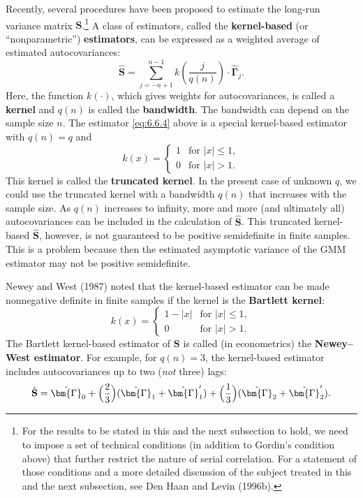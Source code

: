 Recently, several procedures have been proposed to estimate the long-run variance
matrix $\mathbf{S}$.\footnote{For the results to be stated in this and the next subsection to hold, we need to impose a set of technical conditions (in addition to Gordin's condition above) that further restrict the nature of serial correlation. For a statement of those conditions and a more detailed discussion of the subject treated in this and the next subsection, see Den Haan and Levin (1996b).}
A class of estimators, called the \textbf{kernel-based} (or ``nonparametric'')
\textbf{estimators}, can be expressed as a weighted average of estimated autocovariances:
\begin{equation}
  \hat{\mathbf{S}} = \sum_{j=-n+1}^{n-1} k\!\left(\frac{j}{q(n)}\right) \cdot \hat{\bm{\Gamma}}_j.
  \label{eq:6.6.5}
\end{equation}
Here, the function $k(\cdot)$, which gives weights for autocovariances, is called a \textbf{kernel}
and $q(n)$ is called the \textbf{bandwidth}. The bandwidth can depend on the sample size $n$.
The estimator \eqref{eq:6.6.4} above is a special kernel-based estimator with $q(n) = q$ and
\begin{equation}
  k(x) = \begin{cases} 1 & \text{for } |x| \leq 1, \\ 0 & \text{for } |x| > 1. \end{cases}
  \label{eq:6.6.6}
\end{equation}
This kernel is called the \textbf{truncated kernel}. In the present case of unknown $q$,
we could use the truncated kernel with a bandwidth $q(n)$ that increases with the
sample size. As $q(n)$ increases to infinity, more and more (and ultimately all) autocovariances
can be included in the calculation of $\hat{\mathbf{S}}$. This truncated kernel-based
$\hat{\mathbf{S}}$, however, is not guaranteed to be positive semidefinite in finite samples. This is
a problem because then the estimated asymptotic variance of the GMM estimator
may not be positive semidefinite.

Newey and West (1987) noted that the kernel-based estimator can be made
nonnegative definite in finite samples if the kernel is the \textbf{Bartlett kernel}:
\begin{equation}
  k(x) = \begin{cases} 1 - |x| & \text{for } |x| \leq 1, \\ 0 & \text{for } |x| > 1. \end{cases}
  \label{eq:6.6.7}
\end{equation}
The Bartlett kernel-based estimator of $\mathbf{S}$ is called (in econometrics) the \textbf{Newey--West
estimator}. For example, for $q(n) = 3$, the kernel-based estimator includes
autocovariances up to two (\emph{not} three) lags:
\begin{equation}
  \hat{\mathbf{S}} = \hat{\bm{\Gamma}}_0
  + \Bigl(\frac{2}{3}\Bigr)(\hat{\bm{\Gamma}}_1 + \hat{\bm{\Gamma}}_1')
  + \Bigl(\frac{1}{3}\Bigr)(\hat{\bm{\Gamma}}_2 + \hat{\bm{\Gamma}}_2').
  \label{eq:6.6.8}
\end{equation}

